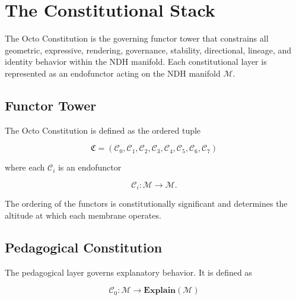 
\section{The Constitutional Stack}
\label{sec:constitutional-stack}

The Octo Constitution is the governing functor tower that constrains all
geometric, expressive, rendering, governance, stability, directional,
lineage, and identity behavior within the NDH manifold. Each constitutional
layer is represented as an endofunctor acting on the NDH manifold
$\mathcal{M}$.


\subsection{Functor Tower}

The Octo Constitution is defined as the ordered tuple

\[
\mathfrak{C} =
(\mathcal{C}_0, \mathcal{C}_1, \mathcal{C}_2,
 \mathcal{C}_3, \mathcal{C}_4, \mathcal{C}_5,
 \mathcal{C}_6, \mathcal{C}_7)
\]

where each $\mathcal{C}_i$ is an endofunctor

\[
\mathcal{C}_i : \mathcal{M} \to \mathcal{M}.
\]

The ordering of the functors is constitutionally significant and determines
the altitude at which each membrane operates.


\subsection{Pedagogical Constitution}

The pedagogical layer governs explanatory behavior. It is defined as

\[
\mathcal{C}_0 : \mathcal{M} \to \mathbf{Explain}(\mathcal{M})
\]

